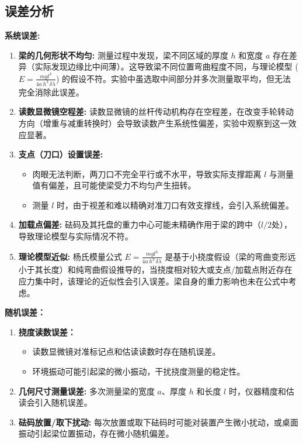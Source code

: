 \documentclass[12pt]{article}
\begin{document}
\subsection{误差分析}
\textbf{系统误差:}
\begin{enumerate}
    \item \textbf{梁的几何形状不均匀:} 测量过程中发现，梁不同区域的厚度 $h$ 和宽度 $a$ 存在差异（实际发现边缘比中间薄）。这导致梁不同位置弯曲程度不同，与理论模型 ($E = \frac{mgl^3}{4a\,h^3\,\delta \lambda}$) 的假设不符。实验中虽选取中间部分并多次测量取平均，但无法完全消除此误差。
    \item \textbf{读数显微镜空程差:} 读数显微镜的丝杆传动机构存在空程差，在改变手轮转动方向（增重与减重转换时）会导致读数产生系统性偏差，实验中观察到这一效应显著。
    \item \textbf{支点（刀口）设置误差:}
    \begin{itemize}
        \item 肉眼无法判断，两刀口不完全平行或不水平，导致实际支撑距离 $l$ 与测量值有偏差，且可能使梁受力不均匀产生扭转。
        \item 测量 $l$ 时，由于视差和难以精确对准刀口有效支撑线，会引入系统偏差。
    \end{itemize}
    \item \textbf{加载点偏差:} 砝码及其托盘的重力中心可能未精确作用于梁的跨中（$l/2$处），导致理论模型与实际情况不符。
    \item \textbf{理论模型近似:} 杨氏模量公式 $E = \frac{mgl^3}{4a\,h^3\,\delta \lambda}$ 是基于小挠度假设（梁的弯曲变形远小于其长度）和纯弯曲假设推导的，当挠度相对较大或支点/加载点附近存在应力集中时，该理论的近似性会引入误差。梁自身的重力影响也未在公式中考虑。
\end{enumerate}
\textbf{随机误差：}
\begin{enumerate}
    \item \textbf{挠度读数误差：}
    \begin{itemize}
        \item 读数显微镜对准标记点和估读读数时存在随机误差。
        \item 环境振动可能引起梁的微小振动，干扰挠度测量的稳定性。
    \end{itemize}
    \item \textbf{几何尺寸测量误差:} 多次测量梁的宽度 $a$、厚度 $h$ 和长度 $l$ 时，仪器精度和估读会引入随机误差。
    \item \textbf{砝码放置/取下扰动:} 每次放置或取下砝码时可能对装置产生微小扰动，或桌面振动引起梁位置振动，存在微小随机偏差。
\end{enumerate}
\end{document}
